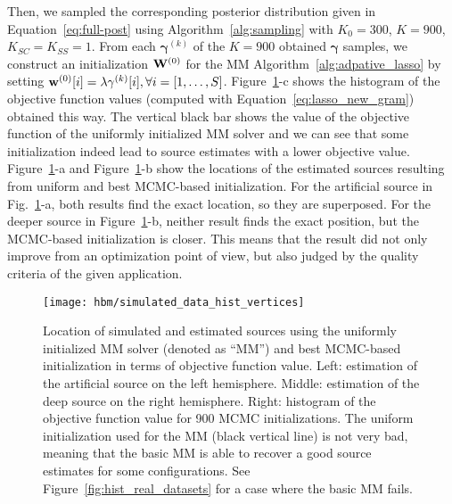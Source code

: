 Then, we sampled the corresponding posterior distribution given in Equation~\eqref{eq:full-post} using Algorithm~\ref{alg:sampling} with $K_0 = 300$, $K = 900$, $K_{SC} = K_{SS} = 1$. From each $\mathbf{\gamma}^{(k)}$ of the $K = 900$ obtained $\mathbf{\gamma}$ samples, we construct an initialization $\mathbf{W}^{(0)}$ for the MM Algorithm~\ref{alg:adpative_lasso} by setting $\mathbf{w}^{(0)}[i] = \lambda \mathbf{\gamma}^{(k)}[i], \forall i=[1,\dots,S]$. Figure~\ref{fig:simu_MM_best_MCMC}-c shows the histogram of the objective function values (computed with Equation~\ref{eq:lasso_new_gram}) obtained this way. The vertical black bar shows the value of the objective function of the uniformly initialized MM solver and we can see that some initialization indeed lead to source estimates with a lower objective value. Figure~\ref{fig:simu_MM_best_MCMC}-a and Figure~\ref{fig:simu_MM_best_MCMC}-b show the locations of the estimated sources resulting from uniform and best MCMC-based initialization. For the artificial source in Fig.~\ref{fig:simu_MM_best_MCMC}-a, both results find the exact location, so they are superposed. For the deeper source in Figure~\ref{fig:simu_MM_best_MCMC}-b, neither result finds the exact position, but the MCMC-based initialization is closer. This means that the result did not only improve from an optimization point of view, but also judged by the quality criteria of the given application.

\begin{figure}[htp]
	\centering
	\texttt{[image: hbm/simulated\_data\_hist\_vertices]}
	\caption{Location of simulated and estimated sources using the uniformly initialized MM solver (denoted as ``MM'') and best MCMC-based initialization in terms of objective function value. Left: estimation of the artificial source on the left hemisphere. Middle: estimation of the deep source on the right hemisphere. Right: histogram of the objective function value for 900 MCMC initializations. The uniform initialization used for the MM (black vertical line) is not very bad, meaning that the basic MM is able to recover a good source estimates for some configurations. See Figure~\ref{fig:hist_real_datasets} for a case where the basic MM fails.}
	\label{fig:simu_MM_best_MCMC}
\end{figure}


